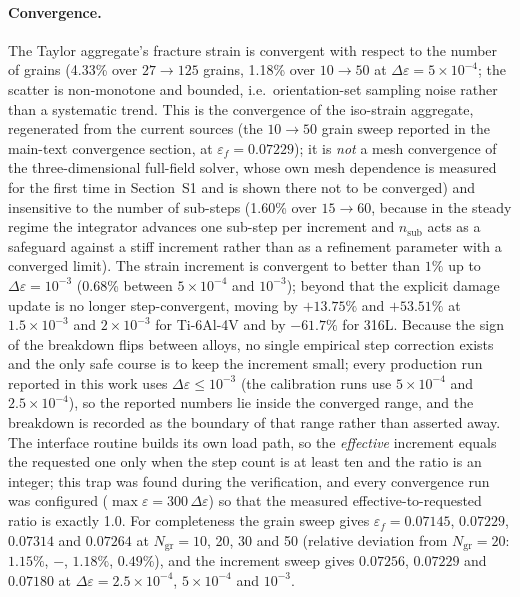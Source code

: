 \documentclass[11pt,a4paper,twocolumn]{article}
\begin{document}
\paragraph{Convergence.} The Taylor aggregate's fracture strain is convergent with respect to the number of grains (4.33\%
over $27 \to 125$ grains, 1.18\% over $10 \to 50$ at $\Delta\varepsilon = 5\times10^{-4}$; the scatter is
non-monotone and bounded, i.e.\ orientation-set sampling noise rather than a systematic trend. This is the convergence of the iso-strain aggregate, regenerated from the current sources (the $10\to50$ grain sweep reported in the main-text convergence section, at $\varepsilon_f=0.07229$); it is \emph{not} a mesh convergence of the three-dimensional full-field solver, whose own mesh dependence is measured for the first time in Section~S1 and is shown there not to be converged) and
insensitive to the number of sub-steps (1.60\% over $15 \to 60$, because in the steady regime the
integrator advances one sub-step per increment and $n_{\mathrm{sub}}$ acts as a safeguard against a stiff
increment rather than as a refinement parameter with a converged limit). The strain increment is
convergent to better than $1\%$ up to $\Delta\varepsilon = 10^{-3}$ (0.68\% between $5\times10^{-4}$ and
$10^{-3}$); beyond that the explicit damage update is no longer step-convergent, moving by $+13.75\%$ and
$+53.51\%$ at $1.5\times10^{-3}$ and $2\times10^{-3}$ for Ti-6Al-4V and by $-61.7\%$ for 316L. Because
the sign of the breakdown flips between alloys, no single empirical step correction exists and the only
safe course is to keep the increment small; every production run reported in this work uses
$\Delta\varepsilon \le 10^{-3}$ (the calibration runs use $5\times10^{-4}$ and $2.5\times10^{-4}$), so
the reported numbers lie inside the converged range, and the breakdown is recorded as the boundary of
that range rather than asserted away. The interface routine builds its own load path, so the
\emph{effective} increment equals the requested one only when the step count is at least ten and the
ratio is an integer; this trap was found during the verification, and every convergence run was
configured ($\max\varepsilon = 300\,\Delta\varepsilon$) so that the measured effective-to-requested
ratio is exactly 1.0. For completeness the grain sweep gives $\varepsilon_f = 0.07145$, $0.07229$, $0.07314$ and $0.07264$ at $N_{\mathrm{gr}} = 10$, 20, 30 and 50 (relative deviation from $N_{\mathrm{gr}}=20$: $1.15\%$, $-$, $1.18\%$, $0.49\%$), and the increment sweep gives $0.07256$, $0.07229$ and $0.07180$ at $\Delta\varepsilon = 2.5\times10^{-4}$, $5\times10^{-4}$ and $10^{-3}$.
\end{document}
